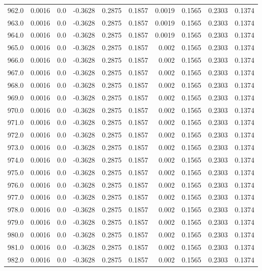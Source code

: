 \begin{longtable}{lrrrrrrrrr}
962.0 & 0.0016 & 0.0 & -0.3628 & 0.2875 & 0.1857 & 0.0019 & 0.1565 & 0.2303 & 0.1374 \\
963.0 & 0.0016 & 0.0 & -0.3628 & 0.2875 & 0.1857 & 0.0019 & 0.1565 & 0.2303 & 0.1374 \\
964.0 & 0.0016 & 0.0 & -0.3628 & 0.2875 & 0.1857 & 0.0019 & 0.1565 & 0.2303 & 0.1374 \\
965.0 & 0.0016 & 0.0 & -0.3628 & 0.2875 & 0.1857 & 0.002 & 0.1565 & 0.2303 & 0.1374 \\
966.0 & 0.0016 & 0.0 & -0.3628 & 0.2875 & 0.1857 & 0.002 & 0.1565 & 0.2303 & 0.1374 \\
967.0 & 0.0016 & 0.0 & -0.3628 & 0.2875 & 0.1857 & 0.002 & 0.1565 & 0.2303 & 0.1374 \\
968.0 & 0.0016 & 0.0 & -0.3628 & 0.2875 & 0.1857 & 0.002 & 0.1565 & 0.2303 & 0.1374 \\
969.0 & 0.0016 & 0.0 & -0.3628 & 0.2875 & 0.1857 & 0.002 & 0.1565 & 0.2303 & 0.1374 \\
970.0 & 0.0016 & 0.0 & -0.3628 & 0.2875 & 0.1857 & 0.002 & 0.1565 & 0.2303 & 0.1374 \\
971.0 & 0.0016 & 0.0 & -0.3628 & 0.2875 & 0.1857 & 0.002 & 0.1565 & 0.2303 & 0.1374 \\
972.0 & 0.0016 & 0.0 & -0.3628 & 0.2875 & 0.1857 & 0.002 & 0.1565 & 0.2303 & 0.1374 \\
973.0 & 0.0016 & 0.0 & -0.3628 & 0.2875 & 0.1857 & 0.002 & 0.1565 & 0.2303 & 0.1374 \\
974.0 & 0.0016 & 0.0 & -0.3628 & 0.2875 & 0.1857 & 0.002 & 0.1565 & 0.2303 & 0.1374 \\
975.0 & 0.0016 & 0.0 & -0.3628 & 0.2875 & 0.1857 & 0.002 & 0.1565 & 0.2303 & 0.1374 \\
976.0 & 0.0016 & 0.0 & -0.3628 & 0.2875 & 0.1857 & 0.002 & 0.1565 & 0.2303 & 0.1374 \\
977.0 & 0.0016 & 0.0 & -0.3628 & 0.2875 & 0.1857 & 0.002 & 0.1565 & 0.2303 & 0.1374 \\
978.0 & 0.0016 & 0.0 & -0.3628 & 0.2875 & 0.1857 & 0.002 & 0.1565 & 0.2303 & 0.1374 \\
979.0 & 0.0016 & 0.0 & -0.3628 & 0.2875 & 0.1857 & 0.002 & 0.1565 & 0.2303 & 0.1374 \\
980.0 & 0.0016 & 0.0 & -0.3628 & 0.2875 & 0.1857 & 0.002 & 0.1565 & 0.2303 & 0.1374 \\
981.0 & 0.0016 & 0.0 & -0.3628 & 0.2875 & 0.1857 & 0.002 & 0.1565 & 0.2303 & 0.1374 \\
982.0 & 0.0016 & 0.0 & -0.3628 & 0.2875 & 0.1857 & 0.002 & 0.1565 & 0.2303 & 0.1374 \\

\end{longtable}
